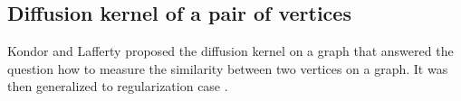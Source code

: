 \subsection{Diffusion kernel of a pair of vertices}
Kondor and Lafferty proposed the diffusion kernel on a graph \cite{kondorDiffusionKernelsGraphs2002} that answered the question how to measure the similarity between two vertices on a graph.
It was then generalized to regularization case \cite{kondorGraphletSpectrum2009}. 



